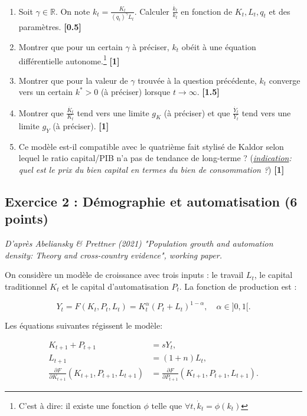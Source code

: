 \documentclass[a4paper,12pt]{article}
\begin{document}
\begin{enumerate}
    \item Soit $\gamma \in \mathbb{R}$. On note $k_t = \frac{K_t}{(q_t)^\gamma L_t}$. Calculer $\frac{\dot{k_t}}{k_t}$ en fonction de $K_t, L_t, q_t$ et des paramètres. \hfill \textbf{[0.5]}
    \item Montrer que pour un certain $\gamma$ à préciser, $k_t$ obéit à une équation différentielle autonome.\footnote{C'est à dire: il existe une fonction $\phi$ telle que $\forall t, \dot{k}_t = \phi(k_t)$} \hfill \textbf{[1]}  
    \item Montrer que pour la valeur de $\gamma$ trouvée à la question précédente, $k_t$ converge vers un certain $k^* > 0$ (à préciser) lorsque $t \to \infty$. \hfill \textbf{[1.5]}
    \item Montrer que $\frac{\dot{K_t}}{K_t}$ tend vers une limite $g_K$ (à préciser) et que $\frac{\dot{Y_t}}{Y_t}$ tend vers une limite $g_Y$ (à préciser). \hfill \textbf{[1]}  
    \item Ce modèle est-il compatible avec le quatrième fait stylisé de Kaldor selon lequel le ratio capital/PIB n’a pas de tendance de long-terme ? (\emph{\underline{indication}: quel est le prix du bien capital en termes du bien de consommation ?}) \hfill \textbf{[1]}  
\end{enumerate}

\subsection*{Exercice 2 : Démographie et automatisation (6 points)}

\emph{D’après Abeliansky \& Prettner (2021) "Population growth and automation density: Theory and cross-country evidence", working paper.}

\hfill

On considère un modèle de croissance avec trois inputs : le travail $L_t$, le capital traditionnel $K_t$ et le capital d’automatisation $P_t$. La fonction de production est :

\begin{equation}
    Y_t = F(K_t, P_t, L_t) = K_t^{\alpha} (P_t + L_t)^{1-\alpha}, \quad \alpha \in ]0,1[.
\end{equation}

Les équations suivantes régissent le modèle:

\begin{align}
    K_{t+1} + P_{t+1} &= s Y_t, \\
    L_{t+1} &= (1 + n)L_t, \\
    \frac{\partial F}{\partial K_{t+1}} (K_{t+1}, P_{t+1}, L_{t+1}) &= \frac{\partial F}{\partial P_{t+1}} (K_{t+1}, P_{t+1}, L_{t+1}).
\end{align}
\end{document}
